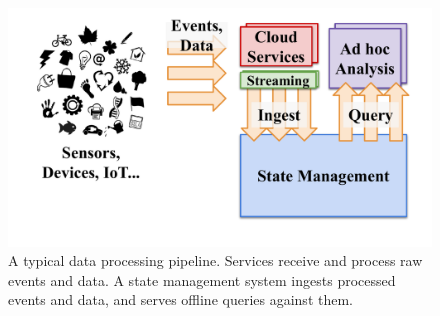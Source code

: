 \begin{figure}[t]
\centering
\includegraphics[width=0.93\columnwidth]{figures/pipeline.pdf}
\caption{
A typical data processing pipeline. Services receive and
process raw events and data. A state management system ingests processed
events and data, and serves offline queries against them.}
\label{fig:pipeline}
\end{figure}
